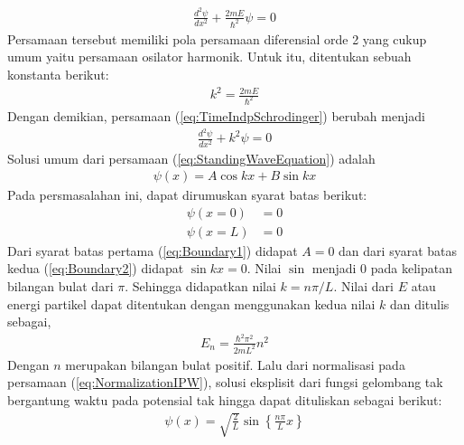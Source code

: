 \begin{align}
    \frac{d^2\psi}{dx^2} + \frac{2mE}{\hbar^2}\psi = 0 \label{eq:TimeIndpSchrodinger}
\end{align}
Persamaan tersebut memiliki pola persamaan diferensial orde 2 yang cukup umum yaitu persamaan osilator harmonik. Untuk itu, ditentukan sebuah konstanta berikut:
\begin{align}
    k^2 = \frac{2mE}{\hbar^2}
\end{align}
Dengan demikian, persamaan (\ref{eq:TimeIndpSchrodinger}) berubah menjadi
\begin{align}
    \frac{d^2\psi}{dx^2} + k^2\psi = 0 \label{eq:StandingWaveEquation}
\end{align}
Solusi umum dari persamaan (\ref{eq:StandingWaveEquation}) adalah
\begin{align}
    \psi(x) = A\cos{kx} + B\sin{kx} \label{eq:GenSolution}
\end{align}
Pada persmasalahan ini, dapat dirumuskan syarat batas berikut:
\begin{align}
    \psi(x=0) &= 0 \label{eq:Boundary1} \\
    \psi(x=L) &= 0 \label{eq:Boundary2}
\end{align}
Dari syarat batas pertama (\ref{eq:Boundary1}) didapat \(A=0\) dan dari syarat batas kedua (\ref{eq:Boundary2}) didapat \(\sin{kx}=0\). Nilai \(\sin\) menjadi 0 pada kelipatan bilangan bulat dari \(\pi\). Sehingga didapatkan nilai \(k = n\pi/L\). Nilai dari \(E\) atau energi partikel dapat ditentukan dengan menggunakan kedua nilai \(k\) dan ditulis sebagai,
\begin{align}
    E_n = \frac{\hbar^2\pi^2}{2mL^2}n^2 \label{eq:EigenEnergy}
\end{align}
Dengan \(n\) merupakan bilangan bulat positif. Lalu dari normalisasi pada persamaan (\ref{eq:NormalizationIPW}), solusi eksplisit dari fungsi gelombang tak bergantung waktu pada potensial tak hingga dapat dituliskan sebagai berikut:
\begin{align}
    \psi(x) = \sqrt{\frac{2}{L}} \sin{\left\{\frac{n\pi}{L}x\right\}} \label{eq:PsiXSolution}
\end{align}
